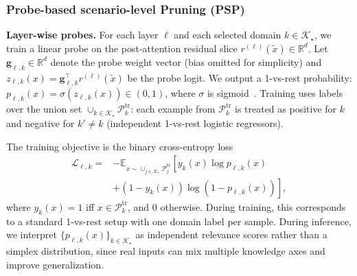 
\subsubsection{Probe-based scenario-level Pruning (PSP)}
\label{sec:method_psp_offline}
\vspace{-1mm}

\textbf{Layer-wise probes.}
For each layer $\ell$ and each selected domain $k\in\mathcal{K}_\star$,
we train a linear probe on the post-attention residual slice $r^{(\ell)}(\tilde{x})\in\mathbb{R}^d$.
Let $\mathbf{g}_{\ell,k}\in\mathbb{R}^d$ denote the probe weight vector (bias omitted for simplicity) and
$z_{\ell,k}(x)=\mathbf{g}_{\ell,k}^\top r^{(\ell)}(\tilde{x})$ be the probe logit.
We output a 1-vs-rest probability: \(p_{\ell,k}(x) = \sigma(z_{\ell,k}(x)) \in (0,1)\), where $\sigma$ is sigmoid~\cite{alain2016linearprobes,belinkov2022probing}.
Training uses labels over the union set $\cup_{k\in\mathcal{K}_\star}\mathcal{P}_k^{\mathrm{tr}}$:
each example from $\mathcal{P}_k^{\mathrm{tr}}$ is treated as positive for $k$ and negative for
$k'\neq k$ (independent 1-vs-rest logistic regressors).

The training objective is the binary cross-entropy loss
\begin{equation}
\label{eq:loss}
\begin{aligned}
\mathcal{L}_{\ell,k}
= &-\mathbb{E}_{x\sim \cup_{j\in\mathcal{K}_\star}\mathcal{P}_j^{\mathrm{tr}}}
\left[
y_k(x)\log p_{\ell,k}\left(x\right) \right.
\\
&\left.+ \left(1-y_k\left(x\right)\right)\log\left(1-p_{\ell,k}\left(x\right)\right)
\right],
\end{aligned}
\end{equation}
where $y_k(x)=1$ iff $x\in\mathcal{P}_k^{\mathrm{tr}}$, and $0$ otherwise.
During training, this corresponds to a standard 1-vs-rest setup with one domain label per sample.
During inference, we interpret $\{p_{\ell,k}(x)\}_{k\in\mathcal{K}_\star}$ as independent relevance scores rather than a simplex distribution, since real inputs can mix multiple knowledge axes and improve generalization.


